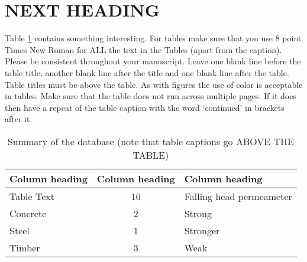 \section{NEXT HEADING}
Table \ref{tab_materials} contains something interesting. For tables make sure that you use 8 point Times New Roman for ALL the text in the Tables (apart from the caption). Please be consistent throughout your manuscript. Leave one blank line before the table title, another blank line after the title and one blank line after the table. Table titles must be above the table. As with figures the use of color is acceptable in tables. Make sure that the table does not run across multiple pages. If it does then have a repeat of the table caption with the word ‘continued’ in brackets after it.


\begin{table}[h]
\begin{center}
\caption{Summary of the database (note that table captions go ABOVE THE TABLE)}
\begin{tabular}{ |l|c|l| }
\hline
 \textbf{Column heading} & \textbf{Column heading}    & \textbf{Column heading} \\ \hline 
 Table Text     & 10     & Falling head permeameter \\  \hline 
 Concrete       & 2      & Strong \\ \hline 
 Steel          & 1      & Stronger \\ \hline 
 Timber         & 3      & Weak \\ 
 \hline
\end{tabular}
\label{tab_materials}
\end{center}
\end{table}
